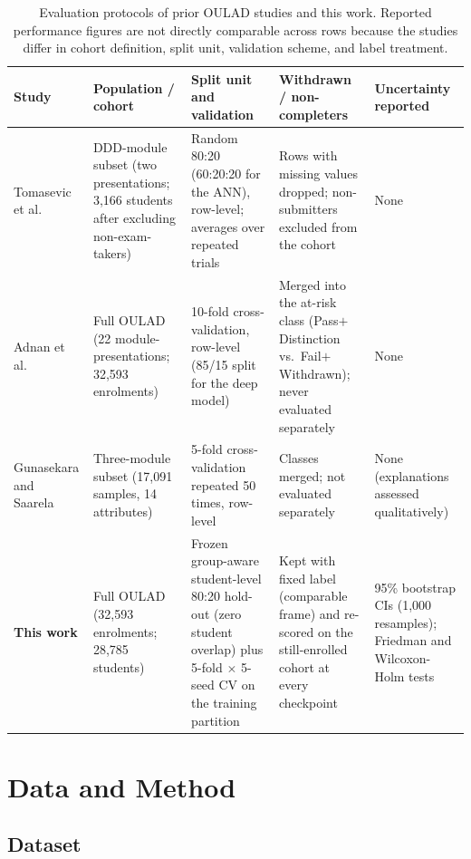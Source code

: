 \documentclass[conference]{IEEEtran}
\begin{document}
\begin{table}[t]
\centering
\caption{Evaluation protocols of prior OULAD studies and this work.
Reported performance figures are not directly comparable across rows because
the studies differ in cohort definition, split unit, validation scheme, and
label treatment.}
\label{tab:protocols}
\footnotesize
\begin{tabular}{@{}p{2.6cm}p{3.6cm}p{3.9cm}p{3.6cm}p{2.6cm}@{}}
\toprule
Study & Population / cohort & Split unit and validation &
Withdrawn / non-completers & Uncertainty reported \\
\midrule
Tomasevic et al.~\cite{tomasevic2020} &
DDD-module subset (two presentations; 3,166 students after excluding
non-exam-takers) &
Random 80:20 (60:20:20 for the ANN), row-level; averages over repeated
trials &
Rows with missing values dropped; non-submitters excluded from the cohort &
None \\
\addlinespace
Adnan et al.~\cite{adnan2021} &
Full OULAD (22 module-presentations; 32,593 enrolments) &
10-fold cross-validation, row-level (85/15 split for the deep model) &
Merged into the at-risk class (Pass$+$Distinction vs.\ Fail$+$Withdrawn);
never evaluated separately &
None \\
\addlinespace
Gunasekara and Saarela~\cite{gunasekara2025} &
Three-module subset (17,091 samples, 14 attributes) &
5-fold cross-validation repeated 50 times, row-level &
Classes merged; not evaluated separately &
None (explanations assessed qualitatively) \\
\addlinespace
\textbf{This work} &
Full OULAD (32,593 enrolments; 28,785 students) &
Frozen group-aware student-level 80:20 hold-out (zero student overlap)
plus 5-fold $\times$ 5-seed CV on the training partition &
Kept with fixed label (comparable frame) and re-scored on the
still-enrolled cohort at every checkpoint &
95\% bootstrap CIs (1,000 resamples); Friedman and Wilcoxon-Holm tests \\
\bottomrule
\end{tabular}
\end{table}

\section{Data and Method}

\subsection{Dataset}
\end{document}
